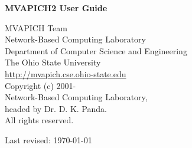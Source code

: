 \begin{minipage}[t]{\textwidth}
	\vspace*{1.0in}

	\begin{center}
	{\Large
		{\bf MVAPICH2 \mvapichversion  User Guide}\\
	}
	\end{center}
	\normalsize
	\begin{center}
		\vspace*{18.0ex}

		{\sc MVAPICH Team}\\
		\vspace*{5.0ex}
		{\sc Network-Based Computing Laboratory}\\
		{\sc Department of Computer Science and Engineering}\\
		{\sc The Ohio State University}\\
		\vspace*{5.0ex}
		{\href{http://mvapich.cse.ohio-state.edu}
		{http://mvapich.cse.ohio-state.edu}}\\

		\vspace*{2.0ex}
		Copyright (c) 2001-\the\year \\
		Network-Based Computing Laboratory, \\
		headed by Dr. D. K. Panda.\\
		All rights reserved.

		\vspace*{4.0ex}
		Last revised: \today
		\vspace*{8.0ex}

	\end{center}
\end{minipage}
\setcounter{page}{0}
\thispagestyle{empty}

\newpage
